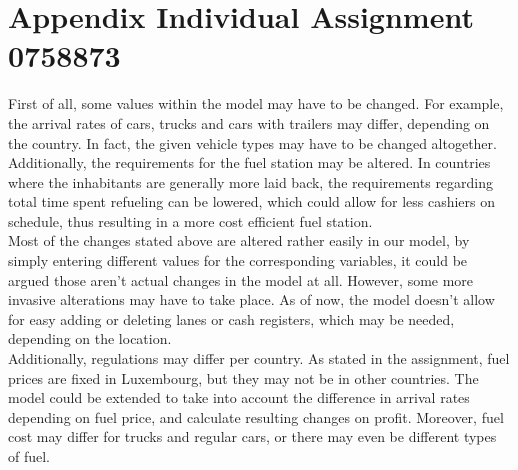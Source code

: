 \section{Appendix Individual Assignment 0758873}\label{app:indivramon}
First of all, some values within the model may have to be changed.
For example, the arrival rates of cars, trucks and cars with trailers may differ, depending on the country.
In fact, the given vehicle types may have to be changed altogether. \\
Additionally, the requirements for the fuel station may be altered.
In countries where the inhabitants are generally more laid back, the requirements regarding total time spent refueling can be lowered, which could allow for less cashiers on schedule, thus resulting in a more cost efficient fuel station. \\

Most of the changes stated above are altered rather easily in our model, by simply entering different values for the corresponding variables, it could be argued those aren't actual changes in the model at all.
However, some more invasive alterations may have to take place.
As of now, the model doesn't allow for easy adding or deleting lanes or cash registers, which may be needed, depending on the location. \\
Additionally, regulations may differ per country.
As stated in the assignment, fuel prices are fixed in Luxembourg, but they may not be in other countries.
The model could be extended to take into account the difference in arrival rates depending on fuel price, and calculate resulting changes on profit.
Moreover, fuel cost may differ for trucks and regular cars, or there may even be different types of fuel. 